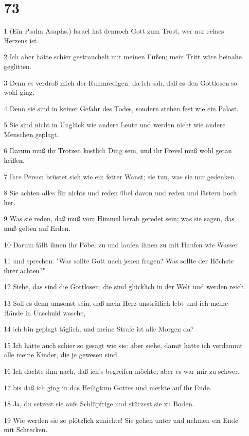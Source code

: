 \chapter{73}

\par 1 (Ein Psalm Asaphs.) Israel hat dennoch Gott zum Trost, wer nur reines Herzens ist.
\par 2 Ich aber hätte schier gestrauchelt mit meinen Füßen; mein Tritt wäre beinahe geglitten.
\par 3 Denn es verdroß mich der Ruhmredigen, da ich sah, daß es den Gottlosen so wohl ging.
\par 4 Denn sie sind in keiner Gefahr des Todes, sondern stehen fest wie ein Palast.
\par 5 Sie sind nicht in Unglück wie andere Leute und werden nicht wie andere Menschen geplagt.
\par 6 Darum muß ihr Trotzen köstlich Ding sein, und ihr Frevel muß wohl getan heißen.
\par 7 Ihre Person brüstet sich wie ein fetter Wanst; sie tun, was sie nur gedenken.
\par 8 Sie achten alles für nichts und reden übel davon und reden und lästern hoch her.
\par 9 Was sie reden, daß muß vom Himmel herab geredet sein; was sie sagen, das muß gelten auf Erden.
\par 10 Darum fällt ihnen ihr Pöbel zu und laufen ihnen zu mit Haufen wie Wasser
\par 11 und sprechen: "Was sollte Gott nach jenen fragen? Was sollte der Höchste ihrer achten?"
\par 12 Siehe, das sind die Gottlosen; die sind glücklich in der Welt und werden reich.
\par 13 Soll es denn umsonst sein, daß mein Herz unsträflich lebt und ich meine Hände in Unschuld wasche,
\par 14 ich bin geplagt täglich, und meine Strafe ist alle Morgen da?
\par 15 Ich hätte auch schier so gesagt wie sie; aber siehe, damit hätte ich verdammt alle meine Kinder, die je gewesen sind.
\par 16 Ich dachte ihm nach, daß ich's begreifen möchte; aber es war mir zu schwer,
\par 17 bis daß ich ging in das Heiligtum Gottes und merkte auf ihr Ende.
\par 18 Ja, du setzest sie aufs Schlüpfrige und stürzest sie zu Boden.
\par 19 Wie werden sie so plötzlich zunichte! Sie gehen unter und nehmen ein Ende mit Schrecken.
